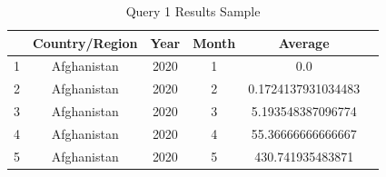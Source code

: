 \documentclass[12pt,oneside]{book} %
\begin{document}
\begin{table}[h]
    \centering
    \captionsetup{font=large}
    \caption{Query 1 Results Sample}
    \normalsize
    \begin{tabular}{|l|c|c|c|c|c|}
        \hline
          & Country/Region & Year & Month & Average            \\
        \hline
        1 & Afghanistan    & 2020 & 1     & 0.0                \\
        2 & Afghanistan    & 2020 & 2     & 0.1724137931034483 \\
        3 & Afghanistan    & 2020 & 3     & 5.193548387096774  \\
        4 & Afghanistan    & 2020 & 4     & 55.36666666666667  \\
        5 & Afghanistan    & 2020 & 5     & 430.741935483871   \\
        \hline
    \end{tabular}\label{tab:query1-results-sample}
\end{table}
\end{document}
